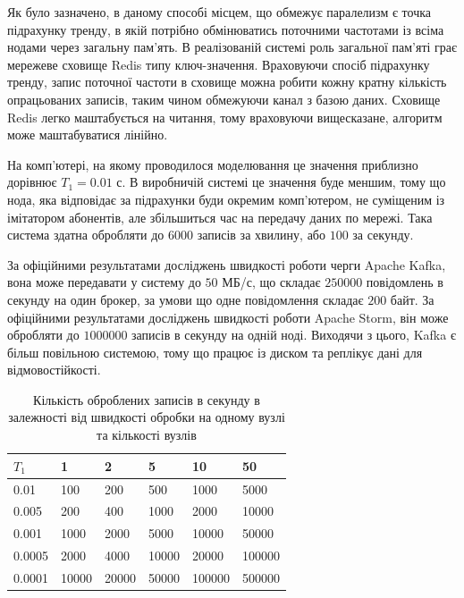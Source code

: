 Як було зазначено, в даному способі місцем, що обмежує паралелизм є точка підрахунку тренду, в якій потрібно обмінюватись поточними частотами із всіма нодами через загальну пам'ять. В реалізованій системі роль загальної пам'яті грає мережеве сховище Redis типу ключ-значення. Враховуючи спосіб підрахунку тренду, запис поточної частоти в сховище можна робити кожну кратну кількість опрацьованих записів, таким чином обмежуючи канал з базою даних. Сховище Redis легко маштабується на читання, тому враховуючи вищесказане, алгоритм може маштабуватися лінійно.

На комп'ютері, на якому проводилося моделювання це значення приблизно дорівнює $T_1 = 0.01$ с. В виробничій системі це значення буде меншим, тому що нода, яка відповідає за підрахунки буди окремим комп'ютером, не суміщеним із імітатором абонентів, але збільшиться час на передачу даних по мережі. Така система здатна обробляти до $6000$ записів за хвилину, або $100$ за секунду.

За офіційними результатами досліджень швидкості роботи черги Apache Kafka, вона може передавати у систему до $50$ МБ/с, що складає $250000$ повідомлень в секунду на один брокер, за умови що одне повідомлення складає $200$ байт. За офіційними результатами досліджень швидкості роботи Apache Storm, він може обробляти до $1000000$ записів в секунду на одній ноді. Виходячи з цього, Kafka є більш повільною системою, тому що працює із диском та реплікує дані для відмовостійкості.

\begin{table}[h]
    \caption{Кількість оброблених записів в секунду в залежності від швидкості обробки на одному вузлі та кількості вузлів}
    \begin{tabularx}{\textwidth}{| X | X | X | X | X | X |}
        \hline
        $T_1$  & 1     & 2    & 5     & 10    & 50     \\ \hline
        0.01   & 100   & 200  & 500   & 1000  & 5000 \\ \hline
        0.005  & 200   & 400  & 1000  & 2000  & 10000 \\ \hline
        0.001  & 1000  & 2000 & 5000  & 10000 & 50000 \\ \hline
        0.0005 & 2000  & 4000 & 10000 & 20000 & 100000 \\ \hline
        0.0001 & 10000 & 20000 & 50000 & 100000 & 500000 \\ \hline
    \end{tabularx}
    \label{tab:realtime-calculate}
\end{table}

